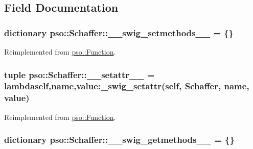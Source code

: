 \subsection{Field Documentation}
\hypertarget{classpso_1_1Schaffer_b037f1ad69b6619f1f89c7ba8e5de505}{
\subsubsection{\setlength{\rightskip}{0pt plus 5cm}dictionary {\bf pso::Schaffer::\_\-\_\-swig\_\-setmethods\_\-\_\-} = \{\}}}
\label{classpso_1_1Schaffer_b037f1ad69b6619f1f89c7ba8e5de505}




Reimplemented from \hyperlink{classpso_1_1Function_2334bfe507115d58047f67960dde71d3}{pso::Function}.\hypertarget{classpso_1_1Schaffer_15fbb90f609e96f5533449e989908d5d}{
\subsubsection{\setlength{\rightskip}{0pt plus 5cm}tuple {\bf pso::Schaffer::\_\-\_\-setattr\_\-\_\-} = lambdaself,name,value:\_\-swig\_\-setattr(self, {\bf Schaffer}, name, value)}}
\label{classpso_1_1Schaffer_15fbb90f609e96f5533449e989908d5d}




Reimplemented from \hyperlink{classpso_1_1Function_cd8775cf6aadc3fdf4e6d82158ef10fb}{pso::Function}.\hypertarget{classpso_1_1Schaffer_3017db451e46ba369ce62cc2b7ee6dba}{
\subsubsection{\setlength{\rightskip}{0pt plus 5cm}dictionary {\bf pso::Schaffer::\_\-\_\-swig\_\-getmethods\_\-\_\-} = \{\}}}
\label{classpso_1_1Schaffer_3017db451e46ba369ce62cc2b7ee6dba}




